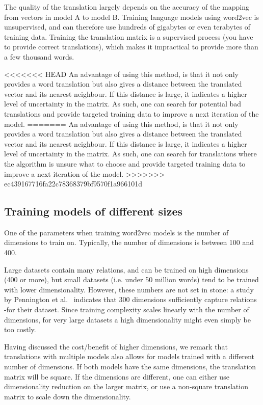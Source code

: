 The quality of the translation largely depends on the accuracy of the mapping from vectors in model A to model B. Training language models using word2vec is unsupervised, and can therefore use hundreds of gigabytes or even terabytes of training data. Training the translation matrix is a supervised process (you have to provide correct translations), which makes it impractical to provide more than a few thousand words.

<<<<<<< HEAD
An advantage of using this method, is that it not only provides a word translation but also gives a distance between the translated vector and its nearest neighbour. If this distance is large, it indicates a higher level of uncertainty in the matrix. As such, one can search for potential bad translations and provide targeted training data to improve a next iteration of the model.
=======
An advantage of using this method, is that it not only provides a word translation but also gives a distance between the translated vector and its nearest neighbour. If this distance is large, it indicates a higher level of uncertainty in the matrix. As such, one can search for translations where the algorithm is unsure what to choose and provide targeted training data to improve a next iteration of the model.
>>>>>>> ec439167716fa22c78368379bf9570f1a966101d

\subsection{Training models of different sizes}
One of the parameters when training word2vec models is the number of dimensions to train on. Typically, the number of dimensions is between 100 and 400\cite{mikolov2013efficient}.

Large datasets contain many relations, and can be trained on high dimensions (400 or more), but small datasets (i.e. under 50 million words) tend to be trained with lower dimensionality. However, these numbers are not set in stone: a study by Pennington et al.~\cite{jeffreypennington2014glove} indicates that 300 dimensions sufficiently capture relations -for their dataset. Since training complexity scales linearly with the number of dimensions, for very large datasets a high dimensionality might even simply be too costly.

Having discussed the cost/benefit of higher dimensions, we remark that translations with multiple models also allows for models trained with a different number of dimensions. If both models have the same dimensions, the translation matrix will be square. If the dimensions are different, one can either use dimensionality reduction on the larger matrix, or use a non-square translation matrix to scale down the dimensionality.